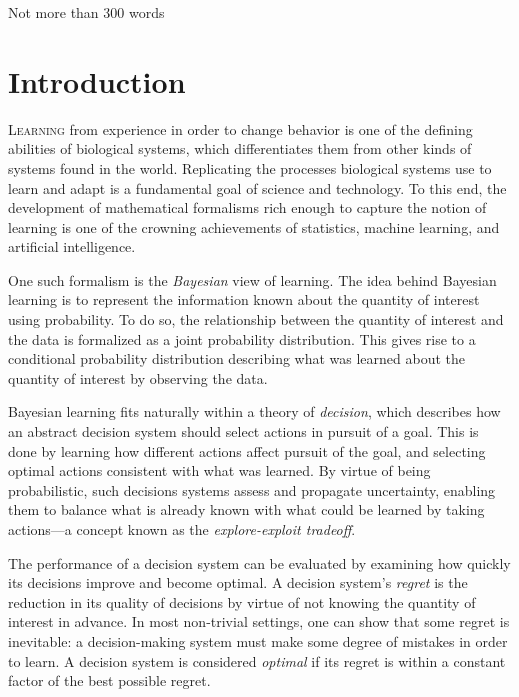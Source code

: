 \documentclass[11pt]{book}
\begin{document}
Not more than 300 words

\tableofcontents





\chapter{Introduction}
\label{ch:intro}

\lettrine{L}{earning} from experience in order to change behavior is one of the defining abilities of biological systems, which differentiates them from other kinds of systems found in the world.
Replicating the processes biological systems use to learn and adapt is a fundamental goal of science and technology.
To this end, the development of mathematical formalisms rich enough to capture the notion of learning is one of the crowning achievements of statistics, machine learning, and artificial intelligence.

One such formalism is the \emph{Bayesian} view of learning.
The idea behind Bayesian learning is to represent the information known about the quantity of interest using probability.
To do so, the relationship between the quantity of interest and the data is formalized as a joint probability distribution.
This gives rise to a conditional probability distribution describing what was learned about the quantity of interest by observing the data.

Bayesian learning fits naturally within a theory of \emph{decision}, which describes how an abstract decision system should select actions in pursuit of a goal.
This is done by learning how different actions affect pursuit of the goal, and selecting optimal actions consistent with what was learned.
By virtue of being probabilistic, such decisions systems assess and propagate uncertainty, enabling them to balance what is already known with what could be learned by taking actions---a concept known as the \emph{explore-exploit tradeoff}.

The performance of a decision system can be evaluated by examining how quickly its decisions improve and become optimal.
A decision system's \emph{regret} is the reduction in its quality of decisions by virtue of not knowing the quantity of interest in advance.
In most non-trivial settings, one can show that some regret is inevitable: a decision-making system must make some degree of mistakes in order to learn.
A decision system is considered \emph{optimal} if its regret is within a constant factor of the best possible regret.
\end{document}
